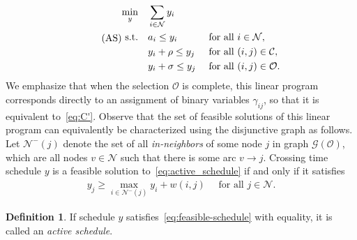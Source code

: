 \documentclass[a4paper]{report}
\theoremstyle{definition}
\newtheorem{define}{Definition}[chapter]
\theoremstyle{plain}
\begin{document}
\begin{equation}\label{eq:active_schedule}\tag{AS}
\begin{alignedat}{3}
  \min_{y} \quad & \sum_{i \in \mathcal{N}} y_{i} \\
  \text{s.t.} \quad & a_{i} \leq y_{i} && \quad \text{ for all } i \in \mathcal{N}, \notag \\
                 & y_{i} + \rho \leq y_{j} && \quad \text{ for all } (i,j) \in \mathcal{C}, \notag \\
                 & y_{i} + \sigma \leq y_{j} && \quad \text{ for all } (i,j) \in \mathcal{O} . \notag
\end{alignedat}
\end{equation}
We emphasize that when the selection $\mathcal{O}$ is complete, this linear
program corresponds directly to an assignment of binary variables $\gamma_{ij}$, so
that it is equivalent to~\eqref{eq:C'}.
%
Observe that the set of feasible solutions of this linear program can
equivalently be characterized using the disjunctive graph as follows.
%
Let $\mathcal{N}^{-}(j)$ denote the set of all \emph{in-neighbors} of some node
$j$ in graph $\mathcal{G}(\mathcal{O})$, which are all nodes $v \in \mathcal{N}$ such that
there is some arc $v \rightarrow j$.
%
Crossing time schedule $y$ is a feasible solution to~\eqref{eq:active_schedule} if and only if it
satisfies
\begin{align}\label{eq:feasible-schedule}
    y_j \geq \max_{i \in \mathcal{N}^{-}(j)} y_i + w(i,j)
    \quad \text{ for all } j \in \mathcal{N} .
\end{align}

\begin{define}\label{def:active}
  If schedule $y$ satisfies~\eqref{eq:feasible-schedule} with equality, it is called an
  \emph{active schedule}.
\end{define}
%
\end{document}
